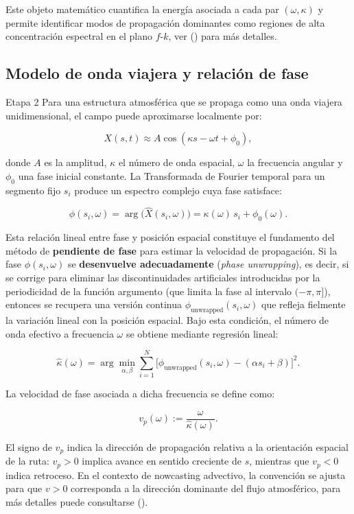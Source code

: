 \documentclass[
  spanish,
  us-letterpaper,
]{scrreprt}
\numberwithin{equation}{section}
\begin{document}
Este objeto matemático cuantifica la energía asociada a cada par
\((\omega, \kappa)\) y permite identificar modos de propagación
dominantes como regiones de alta concentración espectral en el plano
\(f\)-\(k\), ver ()
para más detalles.

\subsection{Modelo de onda viajera y relación de
fase}\label{modelo-de-onda-viajera-y-relaciuxf3n-de-fase}

Etapa 2 Para una estructura atmosférica que se propaga como una onda
viajera unidimensional, el campo puede aproximarse localmente por:

\[
X(s,t) \approx A \cos(\kappa s - \omega t + \phi_0),
\]

donde \(A\) es la amplitud, \(\kappa\) el número de onda espacial,
\(\omega\) la frecuencia angular y \(\phi_0\) una fase inicial
constante. La Transformada de Fourier temporal para un segmento fijo
\(s_i\) produce un espectro complejo cuya fase satisface:

\[
\phi(s_i, \omega) = \arg\big(\hat{X}(s_i, \omega)\big) = \kappa(\omega) \, s_i + \phi_0(\omega).
\]

Esta relación lineal entre fase y posición espacial constituye el
fundamento del método de \textbf{pendiente de fase} para estimar la
velocidad de propagación. Si la fase \(\phi(s_i, \omega)\) se
\textbf{desenvuelve adecuadamente} (\emph{phase unwrapping}), es decir,
si se corrige para eliminar las discontinuidades artificiales
introducidas por la periodicidad de la función argumento (que limita la
fase al intervalo \((-\pi, \pi]\)), entonces se recupera una versión
continua \(\phi_{\text{unwrapped}}(s_i, \omega)\) que refleja fielmente
la variación lineal con la posición espacial. Bajo esta condición, el
número de onda efectivo a frecuencia \(\omega\) se obtiene mediante
regresión lineal:

\[
\hat{\kappa}(\omega) = \arg\min_{\alpha, \beta} \sum_{i=1}^{N} \big[ \phi_{\text{unwrapped}}(s_i, \omega) - (\alpha s_i + \beta) \big]^2.
\]

La velocidad de fase asociada a dicha frecuencia se define como:

\[
v_p(\omega) := \frac{\omega}{\hat{\kappa}(\omega)}.
\]

El signo de \(v_p\) indica la dirección de propagación relativa a la
orientación espacial de la ruta: \(v_p > 0\) implica avance en sentido
creciente de \(s\), mientras que \(v_p < 0\) indica retroceso. En el
contexto de nowcasting advectivo, la convención se ajusta para que
\(v > 0\) corresponda a la dirección dominante del flujo atmosférico,
para más detalles puede consultarse ().
\end{document}
